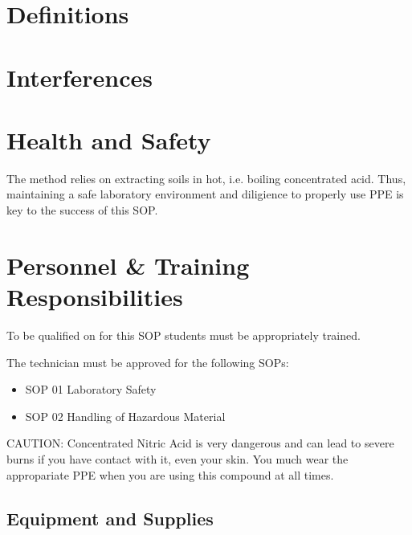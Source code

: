 \documentclass[12pt]{../SOP3_beta}\usepackage[]{graphicx}\usepackage[]{color}
\begin{document}
\section{Definitions}
\section{Interferences}
\section{Health and Safety}

\NP The method relies on extracting soils in hot, i.e. boiling concentrated acid. Thus, maintaining a safe laboratory environment and diligience to properly use PPE is key to the success of this SOP. 


\section{Personnel \& Training Responsibilities}

\NP To be qualified on for this SOP students must be appropriately trained.

The technician must be approved for the following SOPs:

\begin{itemize}
  \item SOP 01 Laboratory Safety
  \item SOP 02 Handling of Hazardous Material
\end{itemize}

CAUTION: Concentrated Nitric Acid is very dangerous and can lead to severe burns if you have contact with it, even your skin. You much wear the appropariate PPE when you are using this compound at all times.

\subsection{Equipment and Supplies}
\end{document}
